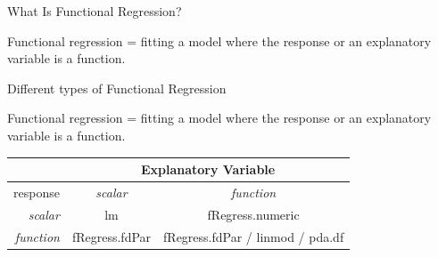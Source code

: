 \documentclass[compress]{beamer}
\begin{document}

\begin{frame}{What Is Functional Regression?}

Functional regression = fitting a model where
the response or an explanatory variable
is a function.

\end{frame}


\begin{frame}{Different types of Functional Regression}

Functional regression = fitting a model where
the response or an explanatory variable
is a function.
\newline \newline \newline
\begin{tabular}{r||c|c|}
          & \multicolumn{2}{|c|}{Explanatory Variable} \\ \hline
 response & \emph{scalar} & \emph{function} \\ \hline \hline

 \emph{scalar}   & lm & fRegress.numeric \\ \hline
 \emph{function} & fRegress.fdPar & fRegress.fdPar / linmod / pda.df \\


\end{tabular}
\end{frame}

\end{document}

